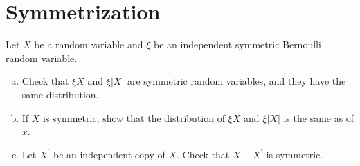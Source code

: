 \section{Symmetrization}
\begin{problem*}[Exercise 6.4.1]\label{ex6.4.1}
	Let \(X\) be a random variable and \(\xi \) be an independent symmetric Bernoulli random variable.
	\begin{enumerate}[(a)]
		\item\label{ex6.4.1:a} Check that \(\xi X\) and \(\xi \lvert X \rvert \) are symmetric random variables, and they have the same distribution.
		\item\label{ex6.4.1:b} If \(X\) is symmetric, show that the distribution of \(\xi X\) and \(\xi \lvert X \rvert \) is the same as of \(x\).
		\item\label{ex6.4.1:c} Let \(X^{\prime} \) be an independent copy of \(X\). Check that \(X - X^{\prime} \) is symmetric.
	\end{enumerate}
\end{problem*}
